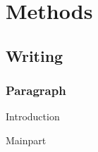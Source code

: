\chapter{Methods}

\section{Writing}

\subsection{Paragraph}

\startitemize[packed,m]
\item Introduction
\item Mainpart
\item 
\stopitemize
